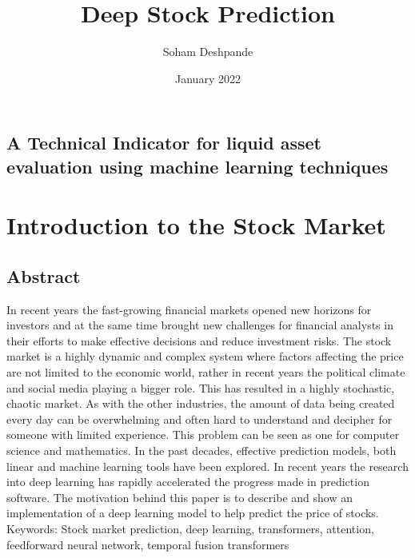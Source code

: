 \documentclass{article}
\title{Deep Stock Prediction}
\author{Soham Deshpande}
\date{January 2022}
\begin{document}
\maketitle
\subsection*{A Technical Indicator for  liquid asset evaluation using machine learning techniques }
\clearpage
\tableofcontents

\clearpage

\section {Introduction to the Stock Market}
\subsection{Abstract}
\normalsize{In recent years the fast-growing financial markets opened new horizons for investors and at the same time brought new challenges for financial analysts in their efforts to make effective decisions and reduce investment risks.
The stock market is a highly dynamic and complex system where factors affecting the price are not limited to the economic world, rather in recent years the political climate and social media playing a bigger role. This has resulted in a highly stochastic, chaotic market. As with the other industries, the amount of data being created every day can be overwhelming and often hard to understand and decipher for someone with limited experience. This problem can be seen as one for computer science and mathematics.
In the past decades, effective prediction models, both linear and machine learning tools have been explored. In recent years the research into deep learning has rapidly accelerated the progress made in prediction software. The motivation behind this paper is to describe and show an implementation of a deep learning model to help predict the price of stocks.
\\
Keywords:
Stock market prediction, deep learning, transformers, attention, feedforward neural network, temporal fusion transformers
}
\end{document}
